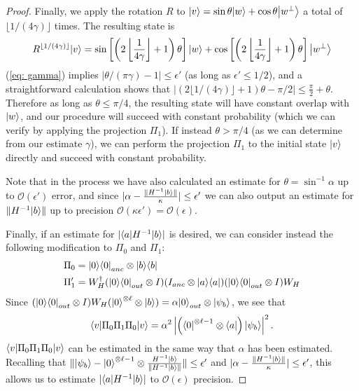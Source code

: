 \documentclass[11pt]{article}
\theoremstyle{definition}
\theoremstyle{remark}
\newcommand\bigoh{\mathcal{O}}
\begin{document}
\begin{proof}
Finally, we apply the rotation $R$ to ${\left\vert{v}\right\rangle} = \sin \theta {\left\vert{w}\right\rangle} +\cos \theta{\left\vert{w^\perp}\right\rangle}$ a total of $\lfloor1/(4\gamma)\rfloor$ times. The resulting state is
\begin{equation}
R^{\lfloor1/(4\gamma)\rfloor}{\left\vert{v}\right\rangle} = \sin\left[\left(2\left\lfloor\frac{1}{4\gamma}\right\rfloor+1\right)\theta\right] {\left\vert{w}\right\rangle} + \cos\left[\left(2\left\lfloor\frac{1}{4\gamma}\right\rfloor+1\right)\theta\right] {\left\vert{w^\perp}\right\rangle}
\end{equation}
(\ref{eq: gamma}) implies $|\theta/(\pi\gamma) - 1| \le \epsilon'$ (as long as $\epsilon' \le 1/2$), and a straightforward calculation shows that $|(2\lfloor1/(4\gamma)\rfloor+1) \theta - \pi/2| \le \frac{\pi}{2}+\theta$. Therefore as long as $\theta \le \pi/4$, the resulting state will have constant overlap with ${\left\vert{w}\right\rangle}$, and our procedure will succeed with constant probability (which we can verify by applying the projection $\Pi_1$). If instead $\theta > \pi/4$ (as we can determine from our estimate $\gamma$), we can perform the projection $\Pi_1$ to the initial state ${\left\vert{v}\right\rangle}$ directly and succeed with constant probability.

Note that in the process we have also calculated an estimate for $\theta = \sin^{-1}\alpha$ up to $\bigoh(\epsilon')$ error, and since $|\alpha - \frac{\|H^{-1}{\left\vert{b}\right\rangle}\|}{\kappa}| \le \epsilon'$ we can also output an estimate for $\|H^{-1}{\left\vert{b}\right\rangle}\|$ up to precision $\mathcal{O}(\kappa \epsilon') = \mathcal{O}(\epsilon)$.

Finally, if an estimate for $|{\left\langle{a}\right\vert} H^{-1} {\left\vert{b}\right\rangle}|$ is desired, we can consider instead the following modification to $\Pi_0$ and $\Pi_1$:
\begin{align}
\Pi_0 &= {\left\vert{0}\right\rangle}{\left\langle{0}\right\vert}_{anc} \otimes {\left\vert{b}\right\rangle}{\left\langle{b}\right\vert} \\
\Pi'_1 &= W_H^\dagger ({\left\vert{0}\right\rangle}{\left\langle{0}\right\vert}_{out} \otimes I) (I_{anc} \otimes {\left\vert{a}\right\rangle}{\left\langle{a}\right\vert})({\left\vert{0}\right\rangle}{\left\langle{0}\right\vert}_{out} \otimes I) W_H
\end{align}
Since $({\left\vert{0}\right\rangle}{\left\langle{0}\right\vert}_{out} \otimes I) W_H ({\left\vert{0}\right\rangle}^{\otimes \ell} \otimes {\left\vert{b}\right\rangle}) = \alpha {\left\vert{0}\right\rangle}_{out} \otimes {\left\vert{\psi_b}\right\rangle}$, we see that 
\begin{equation}
{\left\langle{v}\right\vert}\Pi_0\Pi_1\Pi_0{\left\vert{v}\right\rangle} = \alpha^2\left|\left({\left\langle{0}\right\vert}^{\otimes \ell-1} \otimes {\left\langle{a}\right\vert}\right) {\left\vert{\psi_b}\right\rangle}\right|^2.
\end{equation}
${\left\langle{v}\right\vert}\Pi_0\Pi_1\Pi_0{\left\vert{v}\right\rangle}$ can be estimated in the same way that $\alpha$ has been estimated. Recalling that $\| {\left\vert{\psi_b}\right\rangle} - {\left\vert{0}\right\rangle}^{\otimes \ell-1} \otimes \frac{H^{-1}{\left\vert{b}\right\rangle}} {\|H^{-1}{\left\vert{b}\right\rangle}\|} \| \le \epsilon'$ and $|\alpha - \frac{\|H^{-1}{\left\vert{b}\right\rangle}\|}{\kappa}| \le \epsilon'$, this allows us to estimate $|{\left\langle{a}\right\vert} H^{-1} {\left\vert{b}\right\rangle}|$ to $\bigoh (\epsilon)$ precision.
\end{proof}
\end{document}
